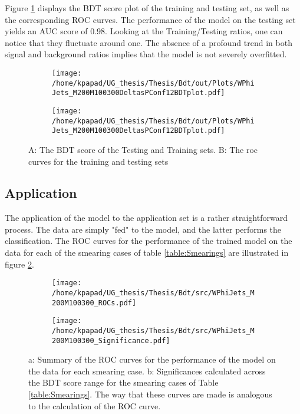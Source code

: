 Figure \ref{fig:BDTplot} displays the BDT score plot of the training and testing set, as well as the corresponding ROC curves. The performance of the model on the testing set yields an AUC score of 0.98. Looking at the Training/Testing ratios, one can notice that they fluctuate around one. The absence of a profound trend in both signal and background ratios implies that the model is not severely overfitted.
\begin{figure}[h!]
\centering
\begin{subfigure}{0.49\textwidth}
\centering
\texttt{[image: /home/kpapad/UG\_thesis/Thesis/Bdt/out/Plots/WPhiJets\_M200M100300DeltasPConf12BDTplot.pdf]}
\caption{}
\end{subfigure}
\begin{subfigure}{0.49\textwidth}
\centering
\texttt{[image: /home/kpapad/UG\_thesis/Thesis/Bdt/out/Plots/WPhiJets\_M200M100300DeltasPConf12BDTplot.pdf]}
\caption{}
\end{subfigure}
\caption{A: The BDT score of the Testing and Training sets. B: The roc curves for the training and testing sets}
\label{fig:BDTplot}
\end{figure}
\newpage
\subsection{Application}
\label{sec:orgf09d0f1}
\label{sec:Application}
The application of the model to the application set is a rather straightforward process. The data are simply "fed" to the model, and the latter performs the classification. The ROC curves for the performance of the trained model on the data for each of the smearing cases of table \ref{table:Smearings} are illustrated in figure \ref{subfig:SmearingROC}.

\begin{figure}[h]
\centering
\begin{subfigure}{0.49\textwidth}
\centering
\texttt{[image: /home/kpapad/UG\_thesis/Thesis/Bdt/src/WPhiJets\_M200M100300\_ROCs.pdf]}
\caption{}
\label{subfig:SmearingROC}
\end{subfigure}
\begin{subfigure}{0.49\textwidth}
\centering
\texttt{[image: /home/kpapad/UG\_thesis/Thesis/Bdt/src/WPhiJets\_M200M100300\_Significance.pdf]}
\caption{}
\label{subfig:SigScan}
\end{subfigure}
\caption{a: Summary of the ROC curves for the performance of the model on the data for each smearing case. b: Significances calculated across the BDT score range for the smearing cases of Table \ref{table:Smearings}. The way that these curves are made is analogous to the calculation of the ROC curve.}
\end{figure}

